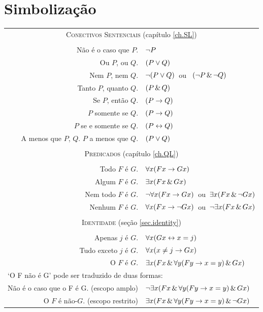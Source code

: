 \section*{Simbolização}
\begin{center}
\label{app.symbolization}
\begin{tabular*}{\textwidth}{rl}
\multicolumn{2}{c}{\textsc{Conectivos Sentenciais} (capítulo \ref{ch.SL})}\\ \\
Não é o caso que $P$. & $\neg P$\\
Ou $P$, ou $Q$. & $(P \vee Q)$\\
Nem $P$, nem $Q$. & $\neg(P \vee Q)$\ ou \ $(\neg P \,\&\, \neg Q)$\\
Tanto $P$, quanto $Q$. & $(P \,\&\, Q)$\\
Se $P$, então $Q$. & $(P \rightarrow Q)$\\
$P$ somente se $Q$. & $(P \rightarrow Q)$\\
$P$ se e somente se $Q$. & $(P \leftrightarrow Q)$\\
A menos que $P$, $Q$. $P$ a menos que $Q$. & $(P \vee Q)$\\
\\
\multicolumn{2}{c}{\label{SymbolizingPredicates}\textsc{Predicados} (capítulo \ref{ch.QL})}\\ \\
Todo $F$ é $G$. & $\forall x(Fx \rightarrow Gx)$\\
Algum $F$ é $G$. & $\exists x(Fx \,\&\, Gx)$\\
Nem todo $F$ é $G$. & $\neg\forall x(Fx \rightarrow Gx)$\ ou\ $\exists x(Fx \,\&\, \neg Gx)$\\
Nenhum $F$ é $G$. & $\forall x(Fx \rightarrow\neg Gx)$\ ou\ $\neg\exists x(Fx \,\&\, Gx)$\\
\\
\multicolumn{2}{c}{\textsc{Identidade} (seção \ref{sec.identity})}\\ \\
Apenas $j$ é $G$. & $\forall x(Gx \leftrightarrow x=j)$\\
Tudo exceto $j$ é $G$. & $\forall x(x \neq j \rightarrow Gx)$\\
O $F$ é $G$. & $\exists x(Fx \,\&\, \forall y(Fy \rightarrow x=y) \,\&\, Gx)$\\
\multicolumn{2}{l}{`O F não é G' pode ser traduzido de duas formas:} \\
Não é o caso que o F é G. (escopo amplo)& $\neg\exists x(Fx \,\&\, \forall y(Fy \rightarrow x=y) \,\&\, Gx)$\\
O $F$ é não-$G$. (escopo restrito) & $\exists x(Fx \,\&\, \forall y(Fy \rightarrow x=y) \,\&\, \neg Gx)$
\end{tabular*}
\end{center}

